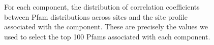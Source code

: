 \begin{figure}[!ht]
 \caption{For each component, the distribution of correlation coefficients between Pfam distributions across sites and the site profile associated with the component.  These are precisely the values we used to select the top 100 Pfams associated with each component.}
 \label{simHist}
\end{figure}

